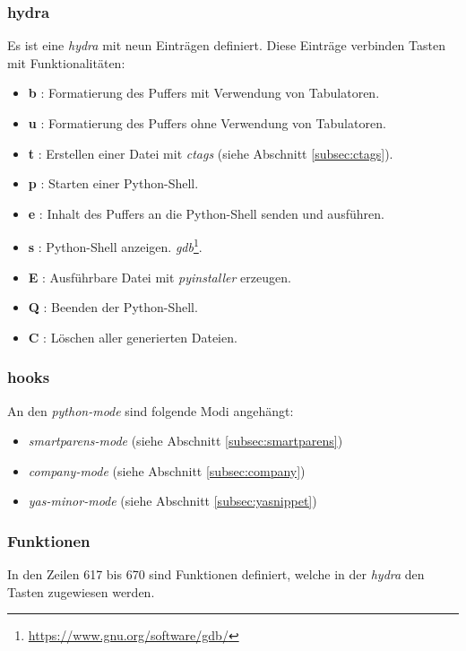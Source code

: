 \subsubsection{hydra}
Es ist eine \textit{hydra} mit neun Einträgen definiert. Diese
Einträge verbinden Tasten mit Funktionalitäten:
\begin{itemize}
\item \textbf{b} : Formatierung des Puffers mit Verwendung von
  Tabulatoren.
\item \textbf{u} : Formatierung des Puffers ohne Verwendung von
  Tabulatoren.
\item \textbf{t} : Erstellen einer Datei mit \textit{ctags} (siehe
  Abschnitt \ref{subsec:ctags}).
\item \textbf{p} : Starten einer Python-Shell.
\item \textbf{e} : Inhalt des Puffers an die Python-Shell senden und
  ausführen.
\item \textbf{s} : Python-Shell anzeigen.
  \textit{gdb}\footnote{\url{https://www.gnu.org/software/gdb/}}.
\item \textbf{E} : Ausführbare Datei mit \textit{pyinstaller}
  erzeugen.
\item \textbf{Q} : Beenden der Python-Shell.
\item \textbf{C} : Löschen aller generierten Dateien.
\end{itemize}

\subsubsection{hooks}
An den \textit{python-mode} sind folgende Modi angehängt:
\begin{itemize}
\item \textit{smartparens-mode} (siehe Abschnitt
  \ref{subsec:smartparens})
\item \textit{company-mode} (siehe Abschnitt \ref{subsec:company})
\item \textit{yas-minor-mode} (siehe Abschnitt
  \ref{subsec:yasnippet})\\
\end{itemize}

\subsubsection{Funktionen}
In den Zeilen 617 bis 670 sind Funktionen definiert, welche in der
\textit{hydra} den Tasten zugewiesen werden.\\

